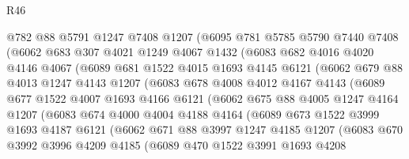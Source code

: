 \begin{lexlean}{R46}
\begin{coremodule}
          @782
          @88
          @5791
          @1247
          @7408
          @1207
          (@6095
            @781
            @5785
            @5790
            @7440
            @7408
            (@6062
              @683
              @307
              @4021
              @1249
              @4067
              @1432
              (@6083
                @682
                @4016
                @4020
                @4146
                @4067
                (@6089
                  @681
                  @1522
                  @4015
                  @1693
                  @4145
                  @6121
                  (@6062
                    @679
                    @88
                    @4013
                    @1247
                    @4143
                    @1207
                    (@6083
                      @678
                      @4008
                      @4012
                      @4167
                      @4143
                      (@6089
                        @677
                        @1522
                        @4007
                        @1693
                        @4166
                        @6121
                        (@6062
                          @675
                          @88
                          @4005
                          @1247
                          @4164
                          @1207
                          (@6083
                            @674
                            @4000
                            @4004
                            @4188
                            @4164
                            (@6089
                              @673
                              @1522
                              @3999
                              @1693
                              @4187
                              @6121
                              (@6062
                                @671
                                @88
                                @3997
                                @1247
                                @4185
                                @1207
                                (@6083
                                  @670
                                  @3992
                                  @3996
                                  @4209
                                  @4185
                                  (@6089
                                    @470
                                    @1522
                                    @3991
                                    @1693
                                    @4208

\end{coremodule}
\end{lexlean}
